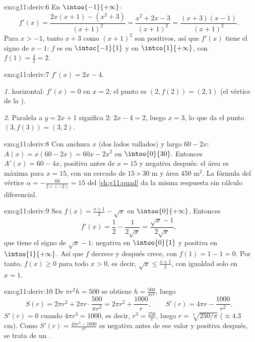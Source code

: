 \begin{solution}{exo:g11:deriv:6}
En $\intoo{-1}{+\infty}$:
\[
f'(x) = \frac{2x(x+1) - (x^2+3)}{(x+1)^2}
= \frac{x^2 + 2x - 3}{(x+1)^2}
= \frac{(x+3)(x-1)}{(x+1)^2}.
\]
Para $x > -1$, tanto $x + 3$ como $(x+1)^2$ son positivos, así que
$f'(x)$ tiene el signo de $x - 1$: $f$ es  en $\intoc{-1}{1}$ y
 en $\intco{1}{+\infty}$, con  $f(1) = \frac{4}{2} = 2$.
\end{solution}

\begin{solution}{exo:g11:deriv:7}
$f'(x) = 2x - 4$.

\emph{1.}  horizontal: $f'(x) = 0$ en $x = 2$; el punto es
$(2, f(2)) = (2, 1)$ (el vértice de la ).

\emph{2.} Paralela a $y = 2x + 1$ significa  $2$: $2x - 4 = 2$,
luego $x = 3$, lo que da el punto $(3, f(3)) = (3, 2)$.
\end{solution}

\begin{solution}{exo:g11:deriv:8}
Con anchura $x$ (dos lados vallados) y largo $60 - 2x$:
$A(x) = x(60 - 2x) = 60x - 2x^2$ en $\intoo{0}{30}$. Entonces
$A'(x) = 60 - 4x$, positiva antes de $x = 15$ y negativa después: el área
es máxima para $x = 15$, con un cercado de $15 \times 30$ m y área
$450$ m$^2$. La fórmula del vértice
$\alpha = -\frac{60}{2 \times (-2)} = 15$ del \cref{ch:g11:quad} da la
misma respuesta sin cálculo diferencial.
\end{solution}

\begin{solution}{exo:g11:deriv:9}
Sea $f(x) = \frac{x+1}{2} - \sqrt x$ en $\intoo{0}{+\infty}$. Entonces
\[
f'(x) = \frac12 - \frac{1}{2\sqrt x} = \frac{\sqrt x - 1}{2\sqrt x},
\]
que tiene el signo de $\sqrt x - 1$: negativa en $\intoo{0}{1}$ y positiva
en $\intoo{1}{+\infty}$. Así que $f$ decrece y después crece, con 
$f(1) = 1 - 1 = 0$. Por tanto, $f(x) \geq 0$ para todo $x > 0$, es decir,
$\sqrt x \leq \frac{x+1}{2}$, con igualdad solo en $x = 1$.
\end{solution}

\begin{solution}{exo:g11:deriv:10}
De $\pi r^2 h = 500$ se obtiene $h = \frac{500}{\pi r^2}$, luego
\[
S(r) = 2\pi r^2 + 2\pi r \cdot \frac{500}{\pi r^2}
= 2\pi r^2 + \frac{1000}{r},
\qquad
S'(r) = 4\pi r - \frac{1000}{r^2}.
\]
$S'(r) = 0$ cuando $4\pi r^3 = 1000$, es decir,
$r^3 = \frac{250}{\pi}$, luego $r = \sqrt[3]{250/\pi}$ ($\approx 4.3$
cm). Como $S'(r) = \frac{4\pi r^3 - 1000}{r^2}$ es negativa antes de ese
valor y positiva después, se trata de un .
\end{solution}

